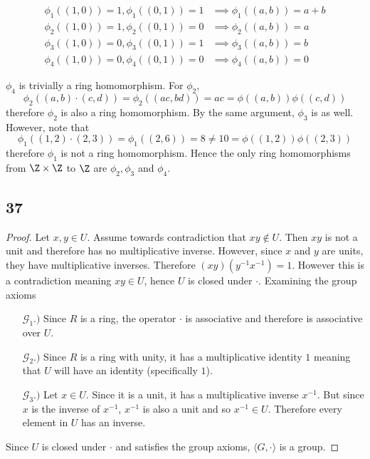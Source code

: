 \documentclass[12pt,titlepage]{extarticle}
\begin{document}
\begin{align*}
    \phi_1((1,0)) = 1, \phi_1((0,1)) = 1 &\implies \phi_1((a,b)) = a+b \\ 
    \phi_2((1,0)) = 1, \phi_2((0,1)) = 0 &\implies \phi_2((a,b)) = a \\ 
    \phi_3((1,0)) = 0, \phi_3((0,1)) = 1 &\implies \phi_3((a,b)) = b \\ 
    \phi_4((1,0)) = 0, \phi_4((0,1)) = 0 &\implies \phi_4((a,b)) = 0
\end{align*}

$\phi_4$ is trivially a ring homomorphism. For $\phi_2$,
\[
    \phi_2((a,b) \cdot (c,d)) = \phi_2((ac, bd)) = ac = \phi((a,b)) \phi((c,d))
\]
therefore $\phi_2$ is also a ring homomorphism. By the same argument, $\phi_3$ is as well. However, note that
\[
    \phi_1((1,2) \cdot (2,3)) = \phi_1((2,6)) = 8 \neq 10 = \phi((1,2)) \phi((2,3))
\]
therefore $\phi_1$ is not a ring homomorphism. Hence the only ring homomorphisms from $\Z \times \Z$ to $\Z$ are $\phi_2, \phi_3$ and $\phi_4$.

\subsection*{37}
\begin{proof}
    Let $x,y \in U$. Assume towards contradiction that $xy \notin U$. Then $xy$ is not a unit and therefore has no multiplicative inverse. However, since $x$ and $y$ are units, they have multiplicative inverses. Therefore $(xy)(y^{-1}x^{-1}) = 1$. However this is a contradiction meaning $xy \in U$, hence $U$ is closed under $\cdot$. Examining the group axioms
    \begin{enumerate}
        \item[$\mathcal{G}_1.)$]
            Since $R$ is a ring, the operator $\cdot$ is associative and therefore is associative over $U$.
        \item[$\mathcal{G}_2.)$]
            Since $R$ is a ring with unity, it has a multiplicative identity $1$ meaning that $U$ will have an identity (specifically $1$).
        \item[$\mathcal{G}_3.)$]
            Let $x \in U$. Since it is a unit, it has a multiplicative inverse $x^{-1}$. But since $x$ is the inverse of $x^{-1}$, $x^{-1}$ is also a unit and so $x^{-1} \in U$. Therefore every element in $U$ has an inverse.
    \end{enumerate}
    Since $U$ is closed under $\cdot$ and satisfies the group axioms, $\langle G, \cdot \rangle$ is a group.
\end{proof}
\end{document}

